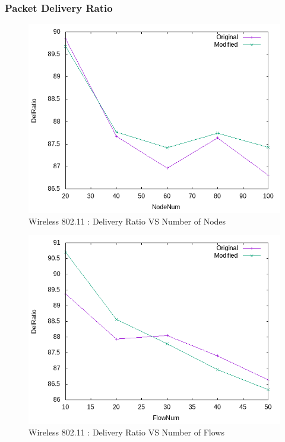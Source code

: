 \subsubsection{Packet Delivery Ratio}
    \begin{figure}[!h] 
        \centering
        \includegraphics[width=.8\textwidth]{Pictures/Wireless802.11Mobile/Combined/DelRatioVSNodeNum.png}
         \caption{Wireless 802.11 : Delivery Ratio VS Number of Nodes}
    \end{figure}
    
     \begin{figure}[!h] 
        \centering
        \includegraphics[width=.8\textwidth]{Pictures/Wireless802.11Mobile/Combined/DelRatioVSFlowNum.png}
         \caption{Wireless 802.11 : Delivery Ratio VS Number of Flows}
    \end{figure}
    
